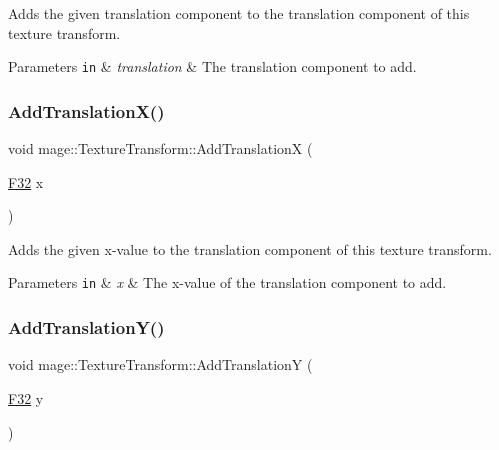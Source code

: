 Adds the given translation component to the translation component of this texture transform.


\begin{DoxyParams}[1]{Parameters}
\mbox{\tt in}  & {\em translation} & The translation component to add. \\
\hline
\end{DoxyParams}
\hypertarget{classmage_1_1_texture_transform_a17719b07810b45e0c669a6c6baff345d}{}\label{classmage_1_1_texture_transform_a17719b07810b45e0c669a6c6baff345d} 
\subsubsection{\texorpdfstring{Add\+Translation\+X()}{AddTranslationX()}}
{\footnotesize\ttfamily void mage\+::\+Texture\+Transform\+::\+Add\+TranslationX (\begin{DoxyParamCaption}\item[{\hyperlink{namespacemage_aa97e833b45f06d60a0a9c4fc22ae02c0}{F32}}]{x }\end{DoxyParamCaption})\hspace{0.3cm}{\ttfamily [noexcept]}}

Adds the given x-\/value to the translation component of this texture transform.


\begin{DoxyParams}[1]{Parameters}
\mbox{\tt in}  & {\em x} & The x-\/value of the translation component to add. \\
\hline
\end{DoxyParams}
\hypertarget{classmage_1_1_texture_transform_a4c9463ef0b5f3730560093d03b31de15}{}\label{classmage_1_1_texture_transform_a4c9463ef0b5f3730560093d03b31de15} 
\subsubsection{\texorpdfstring{Add\+Translation\+Y()}{AddTranslationY()}}
{\footnotesize\ttfamily void mage\+::\+Texture\+Transform\+::\+Add\+TranslationY (\begin{DoxyParamCaption}\item[{\hyperlink{namespacemage_aa97e833b45f06d60a0a9c4fc22ae02c0}{F32}}]{y }\end{DoxyParamCaption})\hspace{0.3cm}{\ttfamily [noexcept]}}

